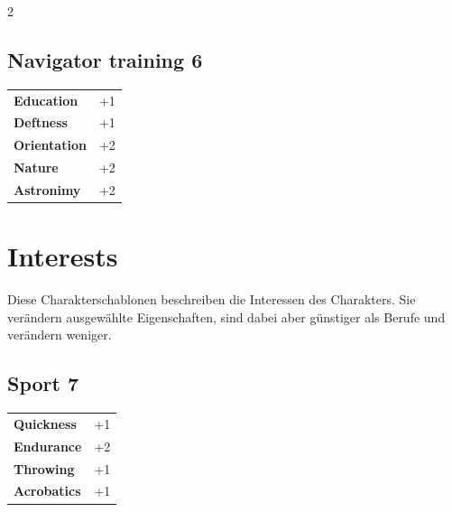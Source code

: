 \begin{multicols}{2}
\begin{tcolorbox}
    \subsection*{Navigator training \hfill \small{6 }}
    \tcblower




\begin{tabular}{@{}ll@{}}
    \textbf{Education} & +1\\
    \textbf{Deftness} & +1\\
    \textbf{Orientation} & +2\\
    \textbf{Nature} & +2\\
    \textbf{Astronimy} & +2\\
\end{tabular}


\end{tcolorbox}

\section{Interests}

Diese Charakterschablonen beschreiben die Interessen des Charakters. Sie verändern ausgewählte Eigenschaften, sind dabei aber günstiger als Berufe und verändern weniger.

\begin{tcolorbox}
    \subsection*{Sport \hfill \small{7 }}
    \tcblower




\begin{tabular}{@{}ll@{}}
    \textbf{Quickness} & +1\\
    \textbf{Endurance} & +2\\
    \textbf{Throwing} & +1\\
    \textbf{Acrobatics} & +1\\
\end{tabular}


\end{tcolorbox}
\end{multicols}
